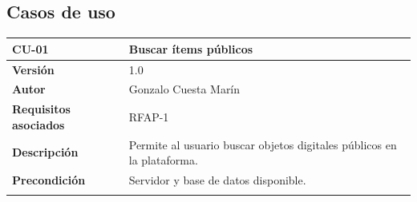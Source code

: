 \documentclass[
]{article}
\begin{document}
\hypertarget{casos-de-uso}{%
\subsection{Casos de uso}\label{casos-de-uso}}

\begin{longtable}[]{@{}ll@{}}
\toprule
\begin{minipage}[b]{0.21\columnwidth}\raggedright
\textbf{CU-01}\strut
\end{minipage} & \begin{minipage}[b]{0.73\columnwidth}\raggedright
\textbf{Buscar ítems públicos}\strut
\end{minipage}\tabularnewline
\midrule
\endhead
\begin{minipage}[t]{0.21\columnwidth}\raggedright
\textbf{Versión}\strut
\end{minipage} & \begin{minipage}[t]{0.73\columnwidth}\raggedright
1.0\strut
\end{minipage}\tabularnewline
\begin{minipage}[t]{0.21\columnwidth}\raggedright
\textbf{Autor}\strut
\end{minipage} & \begin{minipage}[t]{0.73\columnwidth}\raggedright
Gonzalo Cuesta Marín\strut
\end{minipage}\tabularnewline
\begin{minipage}[t]{0.21\columnwidth}\raggedright
\textbf{Requisitos asociados}\strut
\end{minipage} & \begin{minipage}[t]{0.73\columnwidth}\raggedright
RFAP-1\strut
\end{minipage}\tabularnewline
\begin{minipage}[t]{0.21\columnwidth}\raggedright
\textbf{Descripción}\strut
\end{minipage} & \begin{minipage}[t]{0.73\columnwidth}\raggedright
Permite al usuario buscar objetos digitales públicos en la
plataforma.\strut
\end{minipage}\tabularnewline
\begin{minipage}[t]{0.21\columnwidth}\raggedright
\textbf{Precondición}\strut
\end{minipage} & \begin{minipage}[t]{0.73\columnwidth}\raggedright
Servidor y base de datos disponible.\strut
\end{minipage}\tabularnewline
\begin{minipage}[t]{0.21\columnwidth}\raggedright

\end{minipage}
\end{longtable}
\end{document}
